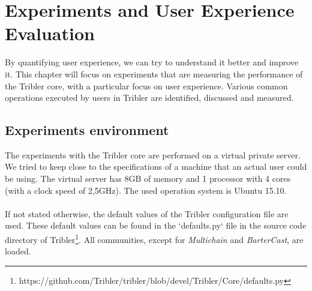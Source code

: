 \chapter{Experiments and User Experience Evaluation}

By quantifying user experience, we can try to understand it better and improve it. This chapter will focus on experiments that are measuring the performance of the Tribler core, with a particular focus on user experience. Various common operations executed by users in Tribler are identified, discussed and measured.

\section{Experiments environment}
The experiments with the Tribler core are performed on a virtual private server. We tried to keep close to the specifications of a machine that an actual user could be using. The virtual server has 8GB of memory and 1 processor with 4 cores (with a clock speed of 2,5GHz). The used operation system is Ubuntu 15.10.\\\\
If not stated otherwise, the default values of the Tribler configuration file are used. These default values can be found in the `defaults.py` file in the source code directory of Tribler\footnote{https://github.com/Tribler/tribler/blob/devel/Tribler/Core/defaults.py}. All communities, except for \emph{Multichain} and \emph{BarterCast}, are loaded.

